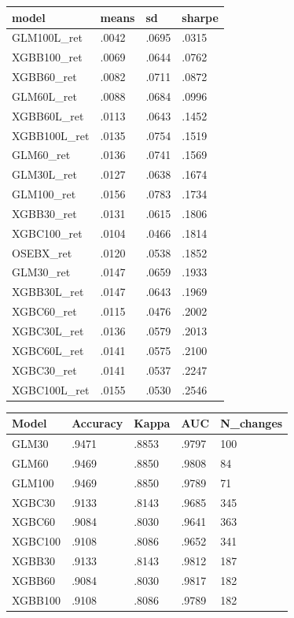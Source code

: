 

\begin{table}[ht]
\centering
\begin{tabular}{llll}
  \hline
model & means & sd & sharpe \\ 
  \hline
GLM100L\_ret    & .0042 & .0695 & .0315 \\ 
  XGBB100\_ret  & .0069 & .0644 & .0762 \\ 
  XGBB60\_ret   & .0082 & .0711 & .0872 \\ 
  GLM60L\_ret   & .0088 & .0684 & .0996 \\ 
  XGBB60L\_ret  & .0113 & .0643 & .1452 \\ 
  XGBB100L\_ret & .0135 & .0754 & .1519 \\ 
  GLM60\_ret    & .0136 & .0741 & .1569 \\ 
  GLM30L\_ret   & .0127 & .0638 & .1674 \\ 
  GLM100\_ret   & .0156 & .0783 & .1734 \\ 
  XGBB30\_ret   & .0131 & .0615 & .1806 \\ 
  XGBC100\_ret  & .0104 & .0466 & .1814 \\ 
  OSEBX\_ret    & .0120 & .0538 & .1852 \\ 
  GLM30\_ret    & .0147 & .0659 & .1933 \\ 
  XGBB30L\_ret  & .0147 & .0643 & .1969 \\ 
  XGBC60\_ret   & .0115 & .0476 & .2002 \\ 
  XGBC30L\_ret  & .0136 & .0579 & .2013 \\ 
  XGBC60L\_ret  & .0141 & .0575 & .2100 \\ 
  XGBC30\_ret   & .0141 & .0537 & .2247 \\ 
  XGBC100L\_ret & .0155 & .0530 & .2546 \\ 
   \hline
\end{tabular}
\end{table}



\begin{table}[ht]
\centering
\begin{tabular}{lllll}
  \hline
Model & Accuracy & Kappa & AUC & N\_changes \\ 
  \hline
GLM30   & .9471 & .8853 & .9797 &   100 \\ 
GLM60   & .9469 & .8850 & .9808 &    84 \\ 
GLM100  & .9469 & .8850 & .9789 &    71 \\ 
XGBC30  & .9133 & .8143 & .9685 &   345 \\ 
XGBC60  & .9084 & .8030 & .9641 &   363 \\ 
XGBC100 & .9108 & .8086 & .9652 &   341 \\ 
XGBB30  & .9133 & .8143 & .9812 &   187 \\ 
XGBB60  & .9084 & .8030 & .9817 &   182 \\ 
XGBB100 & .9108 & .8086 & .9789 &   182 \\ 
   \hline
\end{tabular}
\end{table}




